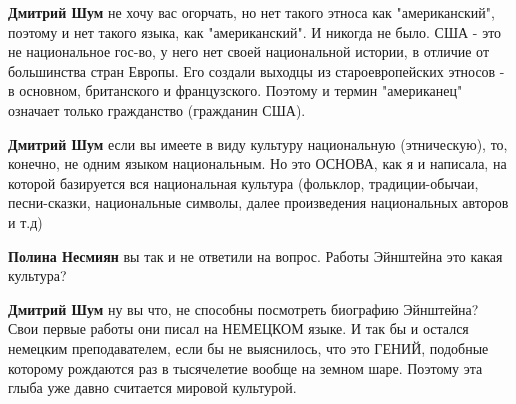 \begin{itemize}
\begin{itemize}
 
\textbf{Дмитрий Шум} не хочу вас огорчать, но нет такого этноса как
"американский", поэтому и нет такого языка, как "американский". И никогда не
было. США - это не национальное гос-во, у него нет своей национальной истории,
в отличие от большинства стран Европы. Его создали выходцы из староевропейских
этносов - в основном, британского и французского. Поэтому и термин "американец"
означает только гражданство (гражданин США).

 
\textbf{Дмитрий Шум} если вы имеете в виду культуру национальную (этническую),
то, конечно, не одним языком национальным. Но это ОСНОВА, как я и написала, на
которой базируется вся национальная культура (фольклор, традиции-обычаи,
песни-сказки, национальные символы, далее произведения национальных авторов и
т.д)

 
\textbf{Полина Несмиян} вы так и не ответили на вопрос. Работы Эйнштейна это какая культура?

 
\textbf{Дмитрий Шум} ну вы что, не способны посмотреть биографию Эйнштейна?
Свои первые работы они писал на НЕМЕЦКОМ языке. И так бы и остался немецким
преподавателем, если бы не выяснилось, что это ГЕНИЙ, подобные которому
рождаются раз в тысячелетие вообще на земном шаре. Поэтому эта глыба уже давно
считается мировой культурой.

 

\end{itemize}
\end{itemize}
